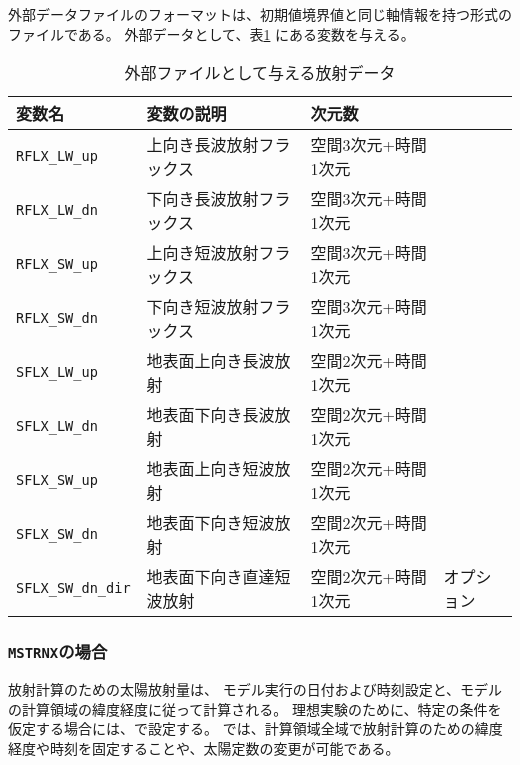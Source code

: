 \noindent
外部データファイルのフォーマットは、初期値境界値と同じ軸情報を持つ{\netcdf}形式のファイルである。
外部データとして、表\ref{tab:var_list_atm_rd_offline} にある変数を与える。
\begin{table}[h]
\begin{center}
  \caption{外部ファイルとして与える放射データ}
  \label{tab:var_list_atm_rd_offline}
  \begin{tabularx}{150mm}{lXll} \hline
    \rowcolor[gray]{0.9}  変数名 & 変数の説明 & 次元数 & \\ \hline
      \verb|RFLX_LW_up|     & 上向き長波放射フラックス & 空間3次元+時間1次元 \\
      \verb|RFLX_LW_dn|     & 下向き長波放射フラックス & 空間3次元+時間1次元 \\
      \verb|RFLX_SW_up|     & 上向き短波放射フラックス & 空間3次元+時間1次元 \\
      \verb|RFLX_SW_dn|     & 下向き短波放射フラックス & 空間3次元+時間1次元 \\
      \verb|SFLX_LW_up|     & 地表面上向き長波放射　　 & 空間2次元+時間1次元 \\
      \verb|SFLX_LW_dn|     & 地表面下向き長波放射　　 & 空間2次元+時間1次元 \\
      \verb|SFLX_SW_up|     & 地表面上向き短波放射　　 & 空間2次元+時間1次元 \\
      \verb|SFLX_SW_dn|     & 地表面下向き短波放射　　 & 空間2次元+時間1次元 \\
      \verb|SFLX_SW_dn_dir| & 地表面下向き直達短波放射 & 空間2次元+時間1次元 & オプション \\
    \hline
  \end{tabularx}
\end{center}
\end{table}


\subsubsection{\texttt{MSTRNX}の場合}

放射計算のための太陽放射量は、
モデル実行の日付および時刻設定と、モデルの計算領域の緯度経度に従って計算される。
理想実験のために、特定の条件を仮定する場合には、で設定する。
では、計算領域全域で放射計算のための緯度経度や時刻を固定することや、太陽定数の変更が可能である。\\

